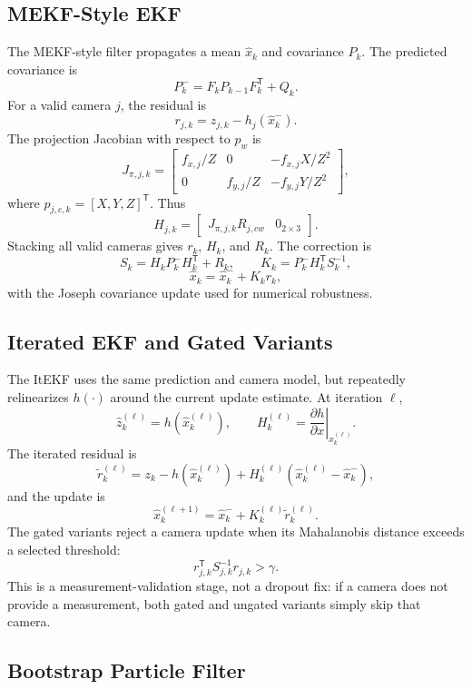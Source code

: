 \documentclass{aiaa-tc}
\newcommand{\T}{\mathsf{T}}
\begin{document}
\subsection{MEKF-Style EKF}

The MEKF-style filter propagates a mean \(\hat x_k\) and covariance \(P_k\).
The predicted covariance is
\[
P^-_k = F_k P_{k-1}F_k^\T + Q_k.
\]
For a valid camera \(j\), the residual is
\[
r_{j,k}=z_{j,k}-h_j(\hat x^-_k).
\]
The projection Jacobian with respect to \(p_w\) is
\[
J_{\pi,j,k} =
\begin{bmatrix}
f_{x,j}/Z & 0 & -f_{x,j}X/Z^2\\
0 & f_{y,j}/Z & -f_{y,j}Y/Z^2
\end{bmatrix},
\]
where \(p_{j,c,k}=[X,Y,Z]^\T\).  Thus
\[
H_{j,k} =
\begin{bmatrix}
J_{\pi,j,k}R_{j,cw} & 0_{2\times 3}
\end{bmatrix}.
\]
Stacking all valid cameras gives \(r_k\), \(H_k\), and \(R_k\).  The correction
is
\[
S_k = H_kP^-_kH_k^\T+R_k,
\qquad
K_k=P^-_kH_k^\T S_k^{-1},
\]
\[
\hat x_k=\hat x^-_k+K_kr_k,
\]
with the Joseph covariance update used for numerical robustness.

\subsection{Iterated EKF and Gated Variants}

The ItEKF uses the same prediction and camera model, but repeatedly
relinearizes \(h(\cdot)\) around the current update estimate.  At iteration
\(\ell\),
\[
\hat z_k^{(\ell)}=h(\hat x_k^{(\ell)}),
\qquad
H_k^{(\ell)}=
\left.\frac{\partial h}{\partial x}\right|_{\hat x_k^{(\ell)}}.
\]
The iterated residual is
\[
\tilde r_k^{(\ell)}
=
z_k-h(\hat x_k^{(\ell)})
+H_k^{(\ell)}(\hat x_k^{(\ell)}-\hat x^-_k),
\]
and the update is
\[
\hat x_k^{(\ell+1)}
=
\hat x^-_k+
K_k^{(\ell)}\tilde r_k^{(\ell)}.
\]
The gated variants reject a camera update when its Mahalanobis distance exceeds
a selected threshold:
\[
r_{j,k}^{\T}S_{j,k}^{-1}r_{j,k}>\gamma.
\]
This is a measurement-validation stage, not a dropout fix: if a camera does not
provide a measurement, both gated and ungated variants simply skip that camera.

\subsection{Bootstrap Particle Filter}
\end{document}
